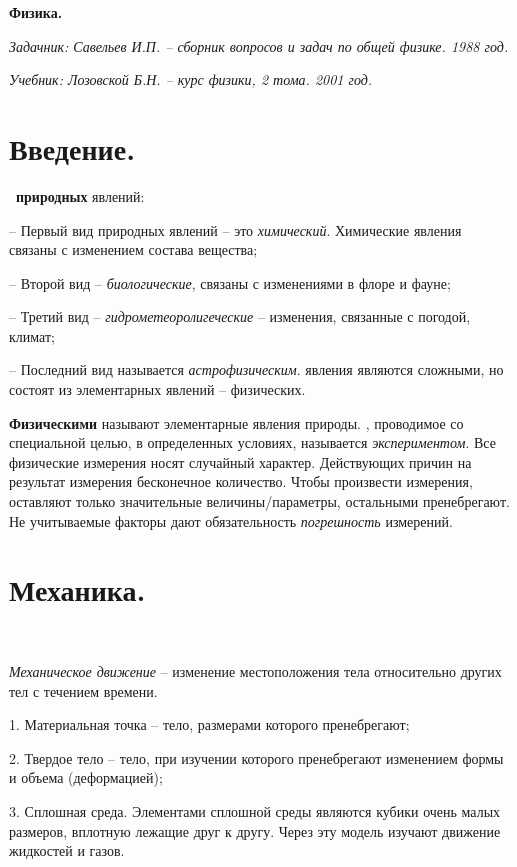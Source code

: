 \documentclass[9pt]{article}
\begin{document}
\begin{center}
    \huge\textbf{Физика.}
\end{center}

\par\textit{Задачник: Савельев И.П. -- сборник вопросов и задач по общей физике. 1988 год.}
\par\textit{Учебник: Лозовской Б.Н. -- курс физики, 2 тома. 2001 год.}

\section{Введение.}

\par\ 
 \textbf{природных} явлений:
\par-- Первый вид природных явлений -- это \textit{химический}. Химические явления связаны с изменением состава вещества;
\par-- Второй вид -- \textit{биологические}, связаны с изменениями в флоре и фауне;
\par-- Третий вид -- \textit{гидрометеоролигеческие} -- изменения, связанные с погодой, климат;
\par-- Последний вид называется \textit{астрофизическим}.
 явления являются сложными, но состоят из элементарных явлений -- физических.
\par\textbf{Физическими} называют элементарные явления природы.
, проводимое со специальной целью, в определенных условиях, называется  \textit{экспериментом}. Все физические измерения носят случайный характер. Действующих причин на результат измерения бесконечное количество. Чтобы произвести измерения, оставляют только значительные величины/параметры, остальными пренебрегают. Не учитываемые факторы дают обязательность \textit{погрешность} измерений.

\section{Механика.}

\par\ 
\par\textit{Механическое движение} -- изменение местоположения тела относительно других тел с течением времени.
\par1. Материальная точка -- тело, размерами которого пренебрегают;
\par2. Твердое тело -- тело, при изучении которого пренебрегают изменением формы и объема (деформацией);
\par3. Сплошная среда. Элементами сплошной среды являются кубики очень малых размеров, вплотную лежащие друг к другу. Через эту модель изучают движение жидкостей и газов.
\end{document}
